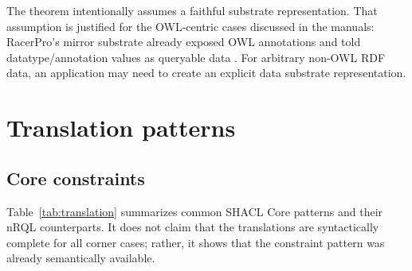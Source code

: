 \documentclass[11pt,letterpaper]{article}
\newcommand{\nrql}{nRQL}
\newcommand{\shacl}{SHACL}
\newcommand{\rdf}{RDF}
\newcommand{\owl}{OWL}
\begin{document}
\medskip

The theorem intentionally assumes a faithful substrate representation. That assumption is justified for the \owl{}-centric cases discussed in the manuals: RacerPro's mirror substrate already exposed \owl{} annotations and told datatype/annotation values as queryable data \cite[pp.~141--143]{racerug}. For arbitrary non-\owl{} \rdf{} data, an application may need to create an explicit data substrate representation.

\section{Translation patterns}

\subsection{Core constraints}

Table~\ref{tab:translation} summarizes common \shacl{} Core patterns and their \nrql{} counterparts. It does not claim that the translations are syntactically complete for all corner cases; rather, it shows that the constraint pattern was already semantically available.
\end{document}
